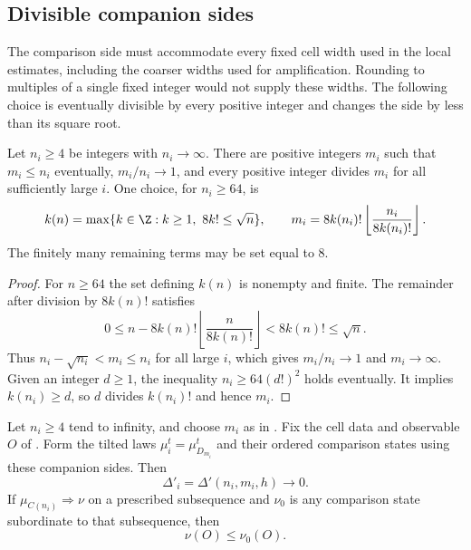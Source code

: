 \subsection{Divisible companion sides}\label{sec:companion-sequences}

The comparison side must accommodate every fixed cell width used in
the local estimates, including the coarser widths used for
amplification. Rounding to multiples of a single fixed integer would
not supply these widths. The following choice is eventually divisible
by every positive integer and changes the side by less than its square
root.

\begin{lemma}\label{lem:companions-exist}
Let $n_i\ge4$ be integers with $n_i\to\infty$. There are positive
integers $m_i$ such that $m_i\le n_i$ eventually, $m_i/n_i\to1$,
and every positive integer divides $m_i$ for all sufficiently large
$i$. One choice, for $n_i\ge64$, is
\[
 k(n)=\max\{k\in\Z:k\ge1,\ 8k!\le\sqrt n\},\qquad
 m_i=8k(n_i)!\left\lfloor\frac{n_i}{8k(n_i)!}\right\rfloor.
\]
The finitely many remaining terms may be set equal to $8$.
\end{lemma}

\begin{proof}
For $n\ge64$ the set defining $k(n)$ is nonempty and finite.
The remainder after division by $8k(n)!$ satisfies
\[
 0\le n-8k(n)!\left\lfloor\frac n{8k(n)!}\right\rfloor
       <8k(n)!\le\sqrt n.
\]
Thus $n_i-\sqrt{n_i}<m_i\le n_i$ for all large $i$, which gives
$m_i/n_i\to1$ and $m_i\to\infty$. Given an integer $d\ge1$,
the inequality $n_i\ge64(d!)^2$ holds eventually. It implies
$k(n_i)\ge d$, so $d$ divides $k(n_i)!$ and hence $m_i$.
\end{proof}

\begin{proposition}
\label{thm:comparison-any-side}
Let $n_i\ge4$ tend to infinity, and choose $m_i$ as in
. Fix the cell data and observable
$O$ of . Form the tilted laws
$\mu_i^t=\mu_{D_{m_i}}^t$ and their ordered comparison states using
these companion sides. Then
\[
 \Delta'_i=\Delta'(n_i,m_i,h)\longrightarrow0.
\]
If $\mu_{C(n_i)}\Rightarrow\nu$ on a prescribed subsequence and
$\nu_0$ is any comparison state subordinate to that subsequence,
then
\begin{equation}\label{eq:sides-limit-comparison}
 \nu(O)\le\nu_0(O).
\end{equation}
\end{proposition}

